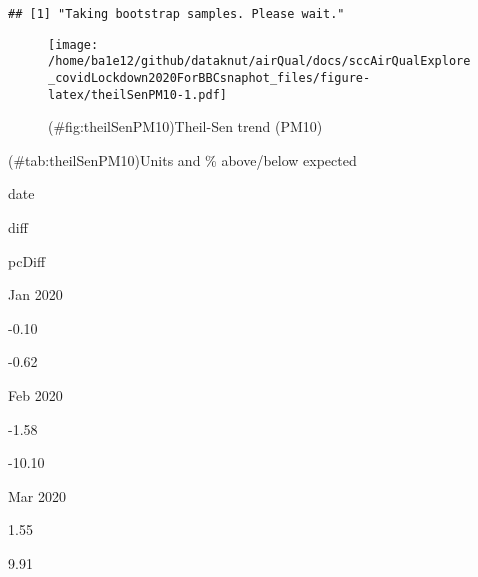 \documentclass[]{article}
\newenvironment{Shaded}{\begin{snugshade}}{\end{snugshade}}
\newcommand{\KeywordTok}[1]{\textcolor[rgb]{0.13,0.29,0.53}{\textbf{#1}}}
\newcommand{\DataTypeTok}[1]{\textcolor[rgb]{0.13,0.29,0.53}{#1}}
\newcommand{\DecValTok}[1]{\textcolor[rgb]{0.00,0.00,0.81}{#1}}
\newcommand{\StringTok}[1]{\textcolor[rgb]{0.31,0.60,0.02}{#1}}
\newcommand{\OperatorTok}[1]{\textcolor[rgb]{0.81,0.36,0.00}{\textbf{#1}}}
\newcommand{\NormalTok}[1]{#1}
\begin{document}
\begin{verbatim}
## [1] "Taking bootstrap samples. Please wait."
\end{verbatim}

\begin{figure}
\centering
\texttt{[image: /home/ba1e12/github/dataknut/airQual/docs/sccAirQualExplore\_covidLockdown2020ForBBCsnaphot\_files/figure-latex/theilSenPM10-1.pdf]}
\caption{(\#fig:theilSenPM10)Theil-Sen trend (PM10)}
\end{figure}

\begin{Shaded}
\end{Shaded}

(\#tab:theilSenPM10)Units and \% above/below expected

date

diff

pcDiff

Jan 2020

-0.10

-0.62

Feb 2020

-1.58

-10.10

Mar 2020

1.55

9.91
\end{document}

